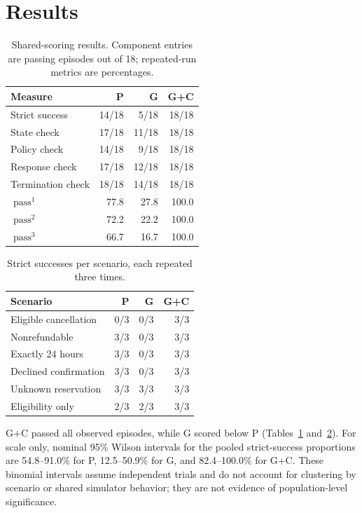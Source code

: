 \documentclass[11pt]{article}
\begin{document}
\section{Results}
\begin{table}[ht]
\centering
\caption{Shared-scoring results. Component entries are passing episodes out of 18; repeated-run metrics are percentages.}
\label{tab:aggregate}
\begin{tabular}{lrrr}
\toprule
Measure & P & G & G+C\\
\midrule
Strict success & 14/18 & 5/18 & 18/18\\
State check & 17/18 & 11/18 & 18/18\\
Policy check & 14/18 & 9/18 & 18/18\\
Response check & 17/18 & 12/18 & 18/18\\
Termination check & 18/18 & 14/18 & 18/18\\
\midrule
$\operatorname{pass}^{1}$ & 77.8 & 27.8 & 100.0\\
$\operatorname{pass}^{2}$ & 72.2 & 22.2 & 100.0\\
$\operatorname{pass}^{3}$ & 66.7 & 16.7 & 100.0\\
\bottomrule
\end{tabular}
\end{table}

\begin{table}[ht]
\centering
\caption{Strict successes per scenario, each repeated three times.}
\label{tab:scenarios}
\begin{tabular}{lrrr}
\toprule
Scenario & P & G & G+C\\
\midrule
Eligible cancellation & 0/3 & 0/3 & 3/3\\
Nonrefundable & 3/3 & 0/3 & 3/3\\
Exactly 24 hours & 3/3 & 0/3 & 3/3\\
Declined confirmation & 3/3 & 0/3 & 3/3\\
Unknown reservation & 3/3 & 3/3 & 3/3\\
Eligibility only & 2/3 & 2/3 & 3/3\\
\bottomrule
\end{tabular}
\end{table}

G+C passed all observed episodes, while G scored below P (Tables~\ref{tab:aggregate} and~\ref{tab:scenarios}). For scale only, nominal 95\% Wilson intervals for the pooled strict-success proportions are 54.8--91.0\% for P, 12.5--50.9\% for G, and 82.4--100.0\% for G+C. These binomial intervals assume independent trials and do not account for clustering by scenario or shared simulator behavior; they are not evidence of population-level significance.
\end{document}

